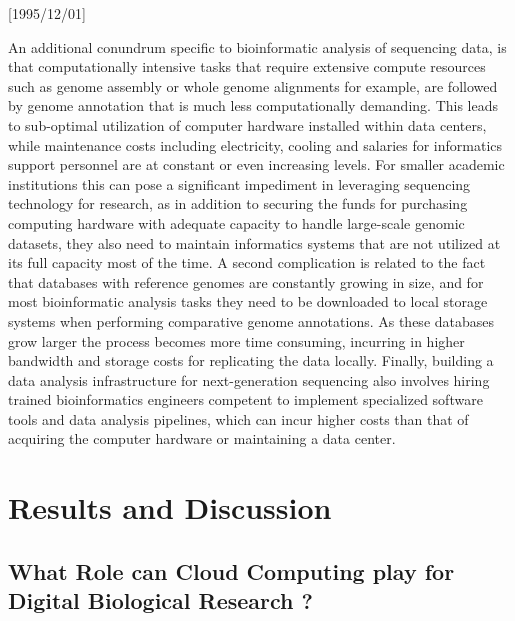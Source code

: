 \NeedsTeXFormat{LaTeX2e}[1995/12/01] \documentclass[10pt]{bmc_article}
\newenvironment{bmcformat}{\begin{raggedright}\baselineskip20pt\sloppy\setboolean{publ}{false}}{\end{raggedright}\baselineskip20pt\sloppy}
\begin{document}
\begin{bmcformat}
An additional conundrum specific to bioinformatic analysis of sequencing data, is that computationally 
intensive tasks  that require extensive compute resources such as genome assembly or whole genome alignments
for example, are followed by genome annotation that is much less computationally demanding. This leads to sub-optimal utilization 
of computer hardware installed within data centers, while maintenance costs including electricity, cooling and salaries
for informatics support personnel are at constant or even increasing levels. For smaller academic institutions this can pose a significant
impediment in leveraging sequencing technology for research, as in addition to securing the funds for purchasing computing
hardware with adequate capacity to handle large-scale genomic datasets, they also need to maintain informatics systems
that are not utilized at its full capacity most of the time.  A second complication is related to the fact that 
databases with reference genomes \cite{Pruitt2009} are constantly growing in size, and for most bioinformatic analysis 
tasks they need  to be downloaded to local storage systems when performing comparative genome annotations. As these 
databases grow larger the process becomes more time consuming, incurring in higher bandwidth and storage costs for replicating 
the data locally.  Finally, building a data analysis infrastructure for next-generation sequencing also involves hiring trained 
bioinformatics engineers competent to implement specialized software tools and data analysis pipelines, which can incur 
higher costs than that of acquiring the computer hardware or maintaining a data center. \pb




\section*{Results and Discussion}

\subsection*{What Role can Cloud Computing play for Digital Biological Research ?}


\end{bmcformat}
\end{document}
